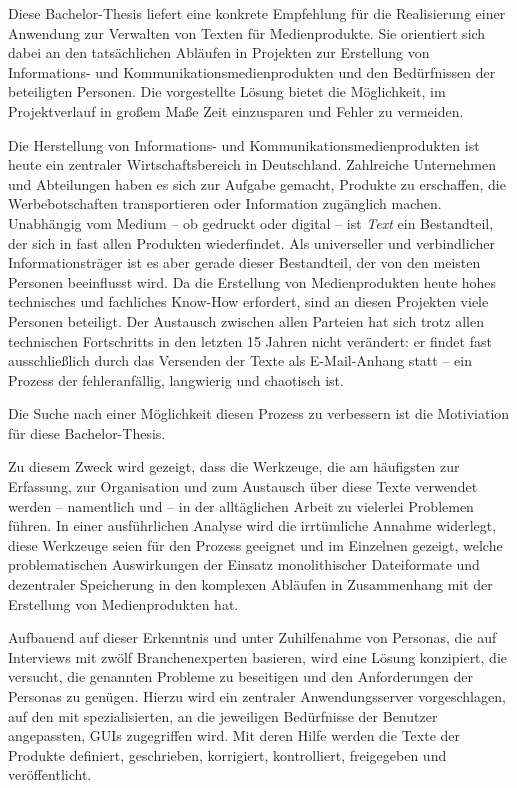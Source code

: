 Diese Bachelor-Thesis liefert eine konkrete Empfehlung für die Realisierung einer Anwendung zur Verwalten von Texten für Medienprodukte. Sie orientiert sich dabei an den tatsächlichen Abläufen in Projekten zur Erstellung von Informations- und Kommunikationsmedienprodukten und den Bedürfnissen der beteiligten Personen. Die vorgestellte Lösung bietet die Möglichkeit, im Projektverlauf in großem Maße Zeit einzusparen und Fehler zu vermeiden.

\secbar

Die Herstellung von Informations- und Kommunikationsmedienprodukten ist heute ein zentraler Wirtschaftsbereich in Deutschland. Zahlreiche Unternehmen und Abteilungen haben es sich zur Aufgabe gemacht, Produkte zu erschaffen, die Werbebotschaften transportieren oder Information zugänglich machen. Unabhängig vom Medium -- ob gedruckt oder digital -- ist \emph{Text} ein Bestandteil, der sich in fast allen Produkten wiederfindet. Als universeller und verbindlicher Informationsträger ist es aber gerade dieser Bestandteil, der von den meisten Personen beeinflusst wird. Da die Erstellung von Medienprodukten heute hohes technisches und fachliches Know-How erfordert, sind an diesen Projekten viele Personen beteiligt. Der Austausch zwischen allen Parteien hat sich trotz allen technischen Fortschritts in den letzten 15 Jahren nicht verändert: er findet fast ausschließlich durch das Versenden der Texte als E-Mail-Anhang statt -- ein Prozess der fehleranfällig, langwierig und chaotisch ist. 

Die Suche nach einer Möglichkeit diesen Prozess zu verbessern ist die Motiviation für diese Bachelor-Thesis. 

Zu diesem Zweck wird gezeigt, dass die Werkzeuge, die am häufigsten zur Erfassung, zur Organisation und zum Austausch über diese Texte verwendet werden -- namentlich  und  -- in der alltäglichen Arbeit zu vielerlei Problemen führen. In einer ausführlichen Analyse wird die irrtümliche Annahme widerlegt, diese Werkzeuge seien für den Prozess geeignet und im Einzelnen gezeigt, welche problematischen Auswirkungen der Einsatz monolithischer Dateiformate und dezentraler Speicherung in den komplexen Abläufen in Zusammenhang mit der Erstellung von Medienprodukten hat.

Aufbauend auf dieser Erkenntnis und unter Zuhilfenahme von Personas, die auf Interviews mit zwölf Branchenexperten basieren, wird eine Lösung konzipiert, die versucht, die genannten Probleme zu beseitigen und den Anforderungen der Personas zu genügen. Hierzu wird ein zentraler Anwendungsserver vorgeschlagen, auf den mit spezialisierten, an die jeweiligen Bedürfnisse der Benutzer angepassten, GUIs zugegriffen wird. Mit deren Hilfe werden die Texte der Produkte definiert, geschrieben, korrigiert, kontrolliert, freigegeben und veröffentlicht.

